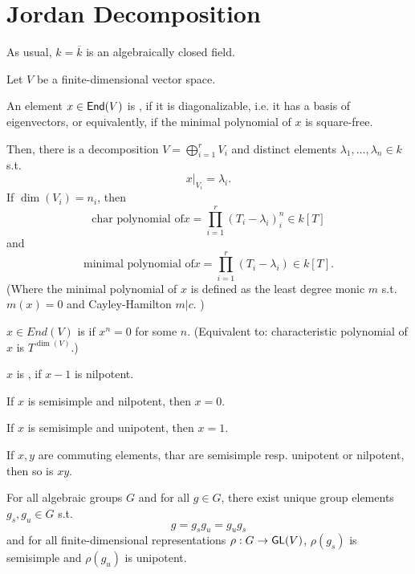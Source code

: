 \section{Jordan Decomposition}
As usual, $k = \overline{k}$ is an algebraically closed field.
\begin{definition}
	Let $V$ be a finite-dimensional vector space.
	
	An element $x \in \textsf{End}(V)$ is , if it is diagonalizable, i.e. it has a basis of eigenvectors, or equivalently, if the minimal polynomial of $x$ is square-free.
	
	Then, there is a decomposition $V = \bigoplus_{i=1}^r V_i$ and distinct elements $\lambda_1, \ldots, \lambda_n \in k$ s.t.
	\[ x|_{V_i} = \lambda_i. \]
	If $\dim(V_i)= n_i$, then
	\[ \text{char polynomial of}x = \prod_{i=1}^r (T_i - \lambda_i)^n_i \in k[T] \]
	and
		\[ \text{minimal polynomial of}x = \prod_{i=1}^r (T_i - \lambda_i) \in k[T]. \]
		(Where the minimal polynomial of $x$ is defined as the least degree monic $m$ s.t. $m(x) = 0$ and Cayley-Hamilton $m | c$. )
\end{definition}

\begin{definition}
	$x \in End(V)$ is  if $x^n = 0$ for some $n$. (Equivalent to: characteristic polynomial of $x$ is $T^{\dim(V)}$.)
	
	$x$ is , if $x -1$ is nilpotent.
\end{definition}

\begin{lemma}
	If $x$ is semisimple and nilpotent, then $x = 0$.
	
	If $x$ is semisimple and unipotent, then $x = 1$.
\end{lemma}
\begin{lemma}
	If $x,y$ are commuting elements, thar are semisimple resp. unipotent or nilpotent, then so is $xy$.
\end{lemma}


\begin{theorem}[Goal]
For all algebraic groups $G$ and for all $g \in G$, there exist unique group elements $g_s, g_u \in G$ s.t.
\[g = g_s g_u = g_ug_s\]
and
for all finite-dimensional representations  $\rho : G \overset{}{\rightarrow} \textsf{GL}(V)$, $\rho(g_s)$ is semisimple and $\rho(g_u)$ is unipotent.
\end{theorem}

